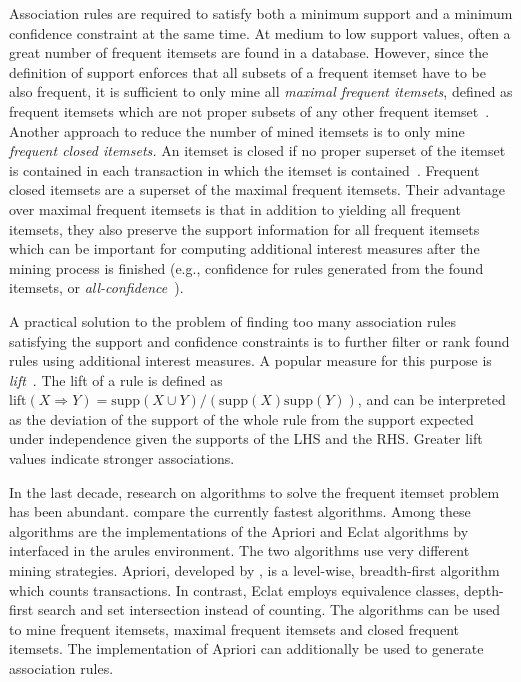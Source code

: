 \documentclass[10pt,a4paper]{article}
\newcommand{\strong}[1]{{\normalfont\fontseries{b}\selectfont #1}}
\newcommand{\pkg}[1]{\strong{#1}}
\begin{document}
Association rules are required to satisfy both a minimum support and a
minimum confidence constraint at the same time.  At medium to low
support values, often a great number of frequent itemsets are found in a
database.  However, since the definition of support enforces that all
subsets of a frequent itemset have to be also frequent, it is sufficient
to only mine all \emph{maximal frequent itemsets}, defined as frequent
itemsets which are not proper subsets of any other frequent
itemset~\citep{arules:Zaki+Parthasarathy+Ogihara+Li:1997}.  Another
approach to reduce the number of mined itemsets is to only mine
\emph{frequent closed itemsets.}  An itemset is closed if no proper
superset of the itemset is contained in each transaction in which the
itemset is contained~\citep{arules:Pasquier+Bastide+Taouil+Lakhal:1999,
  arules:Zaki:2004}.  Frequent closed itemsets are a superset of the
maximal frequent itemsets.  Their advantage over maximal frequent
itemsets is that in addition to yielding all frequent itemsets, they
also preserve the support information for all frequent itemsets which
can be important for computing additional interest measures after the
mining process is finished (e.g., confidence for rules generated from
the found itemsets, or
\emph{all-confidence}~\citep{arules:Omiecinski:2003}).


A practical solution to the problem of finding too many association
rules satisfying the support and confidence constraints is to further
filter or rank found rules using additional interest measures.  A
popular measure for this purpose is
\emph{lift}~\citep{arules:Brin+Motwani+Ullman+Tsur:1997}.  The lift of a
rule is defined as $\mathrm{lift}(X \Rightarrow Y) = \mathrm{supp}(X
\cup Y) / (\mathrm{supp}(X) \mathrm{supp}(Y))$, and can be interpreted
as the deviation of the support of the whole rule from the support
expected under independence given the supports of the LHS and the RHS.
Greater lift values indicate stronger associations.


In the last decade, research on algorithms to solve the frequent itemset
problem has been abundant.  \cite{arules:Goethals+Zaki:2004} compare the
currently fastest algorithms.  Among these algorithms are the
implementations of the Apriori and Eclat algorithms by
\cite{arules:Borgelt:2003} interfaced in the \pkg{arules} environment.
The two algorithms use very different mining strategies.  Apriori,
developed by \cite{arules:Agrawal+Srikant:1994}, is a level-wise,
breadth-first algorithm which counts transactions.  In contrast, Eclat
\citep{arules:Zaki+Parthasarathy+Ogihara+Li:1997} employs equivalence
classes, depth-first search and set intersection instead of counting.
The algorithms can be used to mine frequent itemsets, maximal frequent
itemsets and closed frequent itemsets.  The implementation of Apriori
can additionally be used to generate association rules.
\end{document}
